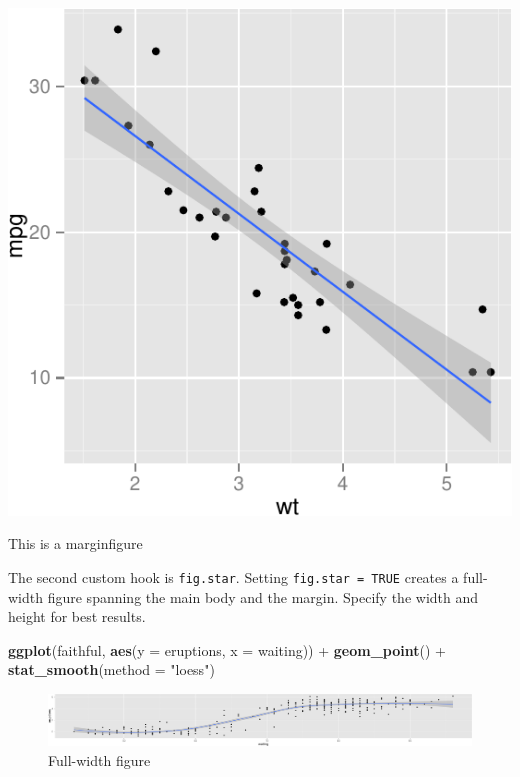 \documentclass{tufte-handout}
\newenvironment{Shaded}{}{}
\newcommand{\KeywordTok}[1]{\textcolor[rgb]{0.00,0.44,0.13}{\textbf{{#1}}}}
\newcommand{\DataTypeTok}[1]{\textcolor[rgb]{0.56,0.13,0.00}{{#1}}}
\newcommand{\StringTok}[1]{\textcolor[rgb]{0.25,0.44,0.63}{{#1}}}
\newcommand{\NormalTok}[1]{{#1}}
\begin{document}
\begin{marginfigure}
 \includegraphics{./pindex_files/figure-latex/fig1}
\caption{ This is a marginfigure }
\end{marginfigure}

The second custom hook is \texttt{fig.star}. Setting
\texttt{fig.star = TRUE} creates a full-width figure spanning the main
body and the margin. Specify the width and height for best results.

\begin{Shaded}
\begin{Highlighting}[]
\KeywordTok{ggplot}\NormalTok{(faithful, }\KeywordTok{aes}\NormalTok{(}\DataTypeTok{y =} \NormalTok{eruptions, }\DataTypeTok{x =} \NormalTok{waiting)) +}\StringTok{ }
\StringTok{    }\KeywordTok{geom_point}\NormalTok{() +}\StringTok{ }\KeywordTok{stat_smooth}\NormalTok{(}\DataTypeTok{method =} \StringTok{"loess"}\NormalTok{)}
\end{Highlighting}
\end{Shaded}

\begin{figure}
 \includegraphics{./pindex_files/figure-latex/fig2}
\caption{ Full-width figure }
\end{figure}
\end{document}
